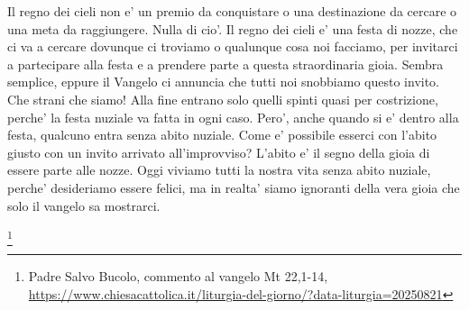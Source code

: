 \begin{vcentered}
Il regno dei cieli non e' un premio da conquistare o una destinazione da cercare o una meta da raggiungere. Nulla di cio'. Il regno dei cieli e' una festa di nozze, che ci va a cercare dovunque ci troviamo o qualunque cosa noi facciamo, per invitarci a partecipare alla festa e a prendere parte a questa straordinaria gioia. Sembra semplice, eppure il Vangelo ci annuncia che tutti noi snobbiamo questo invito. Che strani che siamo! Alla fine entrano solo quelli spinti quasi per costrizione, perche' la festa nuziale va fatta in ogni caso. Pero', anche quando si e' dentro alla festa, qualcuno entra senza abito nuziale. Come e' possibile esserci con l'abito giusto con un invito arrivato all'improvviso? L'abito e' il segno della gioia di essere parte alle nozze. Oggi viviamo tutti la nostra vita senza abito nuziale, perche' desideriamo essere felici, ma in realta' siamo ignoranti della vera gioia che solo il vangelo sa mostrarci.

    \footnote{Padre Salvo Bucolo, commento al vangelo Mt 22,1-14, \url{https://www.chiesacattolica.it/liturgia-del-giorno/?data-liturgia=20250821}}
\end{vcentered}
